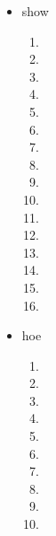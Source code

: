 \documentclass[titlepage]{article}
\begin{document}
\begin{itemize}
\begin{enumerate}
                            \item
                            \item
                            \item
                        \end{enumerate}
                    \item show
                        \begin{enumerate}
                            \item
                            \item
                            \item
                            \item
                            \item
                            \item
                            \item
                            \item
                            \item
                            \item
                            \item
                            \item
                            \item
                            \item
                            \item
                            \item
                        \end{enumerate}
                    \item hoe
                        \begin{enumerate}
                            \item
                            \item
                            \item
                            \item
                            \item
                            \item
                            \item
                            \item
                            \item
                            \item

\end{enumerate}
\end{itemize}
\end{document}
